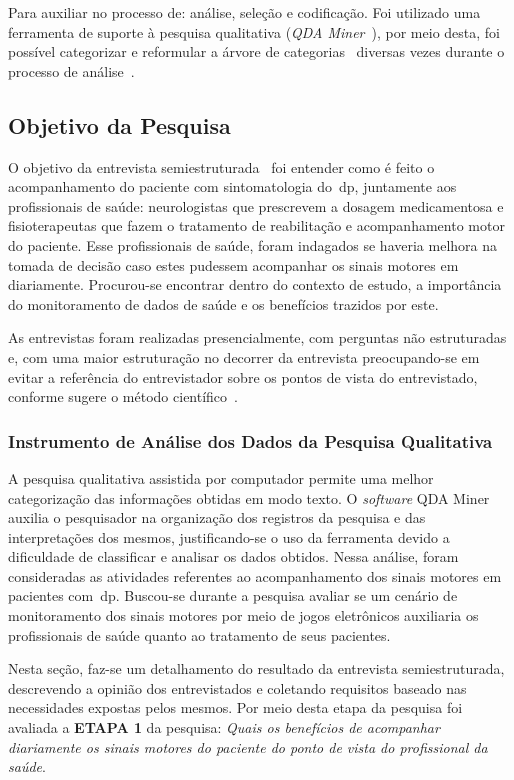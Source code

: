 Para auxiliar no processo de: análise, seleção e codificação. Foi utilizado uma ferramenta de suporte à pesquisa qualitativa (\textit{QDA Miner}~\cite{qda13}), por meio desta, foi possível categorizar e reformular a árvore de categorias~\cite{FLI04} diversas vezes durante o processo de análise~\cite{FLI04}.


\subsection{Objetivo da Pesquisa}
O objetivo da entrevista semiestruturada~\cite{FLI04} foi entender como é feito o acompanhamento do paciente com sintomatologia do~\ac{dp}, juntamente aos profissionais de saúde: neurologistas que prescrevem a dosagem medicamentosa e fisioterapeutas que fazem o tratamento  de reabilitação e acompanhamento motor do paciente. Esse profissionais de saúde, foram indagados se haveria melhora na tomada de decisão caso estes pudessem acompanhar os sinais motores em diariamente. Procurou-se encontrar dentro do contexto de estudo, a importância do monitoramento de dados de saúde e os benefícios trazidos por este.

As entrevistas foram realizadas presencialmente, com perguntas não estruturadas e, com uma maior estruturação no decorrer da entrevista preocupando-se em evitar a referência do entrevistador sobre os pontos de vista do entrevistado, conforme sugere o método científico~\cite{FLI04}. 

\subsubsection{Instrumento de Análise dos Dados da Pesquisa Qualitativa} \label{section:analise_dados} 
A pesquisa qualitativa assistida por computador permite uma melhor categorização das informações obtidas em modo texto. O \textit{software} QDA Miner~\cite{qda13} auxilia o pesquisador na organização dos registros da pesquisa e das interpretações dos mesmos, justificando-se o uso da ferramenta devido a dificuldade de classificar e analisar os dados obtidos. Nessa análise, foram consideradas as atividades referentes ao acompanhamento dos sinais motores em pacientes com~\ac{dp}. Buscou-se durante a pesquisa avaliar se um cenário de monitoramento dos sinais motores por meio de jogos eletrônicos auxiliaria os profissionais de saúde quanto ao tratamento de seus pacientes.

Nesta seção, faz-se um detalhamento do resultado da entrevista semiestruturada, descrevendo a opinião dos entrevistados e coletando requisitos baseado nas necessidades expostas pelos mesmos. Por meio desta etapa da pesquisa foi avaliada a \textbf{ETAPA 1} da pesquisa: \textit{Quais os benefícios de acompanhar diariamente os sinais motores do paciente do ponto de vista do profissional da saúde}.

